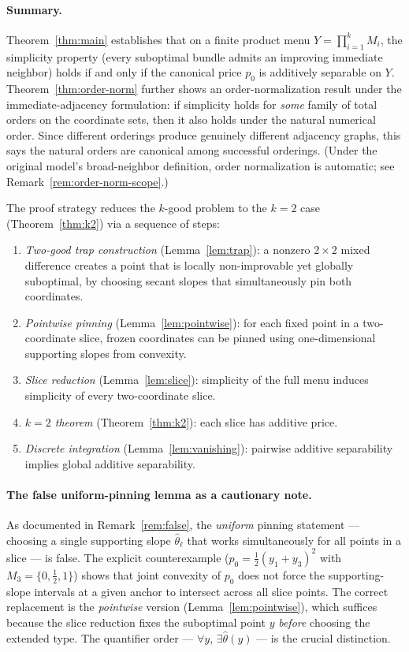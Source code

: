 \documentclass[11pt]{article}
\begin{document}
\paragraph{Summary.}
Theorem~\ref{thm:main} establishes that on a finite product menu
$Y = \prod_{i=1}^k M_i$, the simplicity property (every suboptimal bundle admits
an improving immediate neighbor) holds if and only if the canonical price
$p_0$ is additively separable on $Y$.
Theorem~\ref{thm:order-norm} further shows an order-normalization
result under the immediate-adjacency formulation: if simplicity holds
for \emph{some} family of total orders on the coordinate sets, then it
also holds under the natural numerical order.
Since different orderings produce genuinely different adjacency graphs,
this says the natural orders are canonical among successful orderings.
(Under the original model's broad-neighbor definition, order normalization
is automatic; see Remark~\ref{rem:order-norm-scope}.)

The proof strategy reduces the $k$-good problem to the
$k=2$ case (Theorem~\ref{thm:k2}) via a sequence of steps:
\begin{enumerate}[label=(\roman*)]
  \item \emph{Two-good trap construction} (Lemma~\ref{lem:trap}): a nonzero
    $2 \times 2$ mixed difference creates a point that is locally non-improvable
    yet globally suboptimal, by choosing secant slopes that simultaneously pin
    both coordinates.
  \item \emph{Pointwise pinning} (Lemma~\ref{lem:pointwise}): for each
    fixed point in a two-coordinate slice, frozen coordinates can be
    pinned using one-dimensional supporting slopes from convexity.
  \item \emph{Slice reduction} (Lemma~\ref{lem:slice}): simplicity of the
    full menu induces simplicity of every two-coordinate slice.
  \item \emph{$k=2$ theorem} (Theorem~\ref{thm:k2}): each slice has additive price.
  \item \emph{Discrete integration} (Lemma~\ref{lem:vanishing}): pairwise
    additive separability implies global additive separability.
\end{enumerate}

\paragraph{The false uniform-pinning lemma as a cautionary note.}
As documented in Remark~\ref{rem:false}, the \emph{uniform} pinning statement
--- choosing a single supporting slope $\hat\theta_\ell$ that works
simultaneously for all points in a slice --- is false.
The explicit counterexample ($p_0 = \frac{1}{2}(y_1+y_3)^2$ with
$M_3 = \{0,\frac{1}{2},1\}$) shows that joint convexity of $p_0$ does not
force the supporting-slope intervals at a given anchor to intersect across
all slice points.
The correct replacement is the \emph{pointwise} version
(Lemma~\ref{lem:pointwise}), which suffices because the slice reduction
fixes the suboptimal point $y$ \emph{before} choosing the extended type.
The quantifier order --- $\forall y$, $\exists \hat\theta(y)$ --- is
the crucial distinction.
\end{document}
